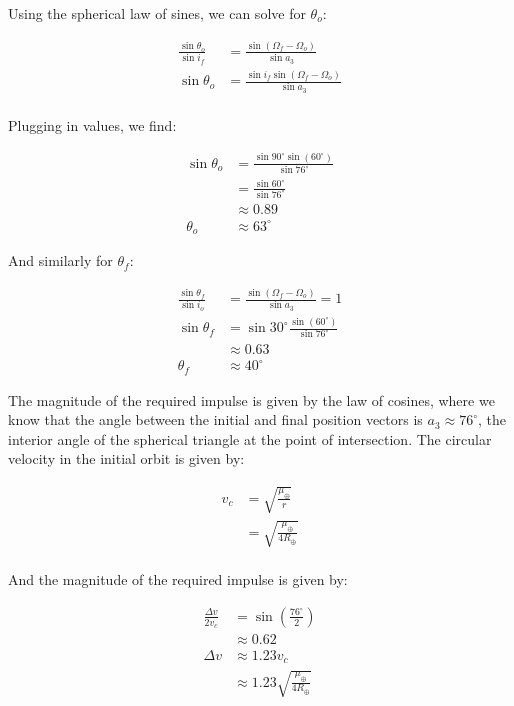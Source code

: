 Using the spherical law of sines, we can solve for $\theta_o$:

\begin{align*}
    \frac{\sin\theta_o}{\sin i_f} &= \frac{\sin(\Omega_f - \Omega_o)}{\sin a_3} \\
    \sin\theta_o &= \frac{\sin i_f \sin(\Omega_f - \Omega_o)}{\sin a_3} \\
\end{align*}

Plugging in values, we find:

\begin{align*}
    \sin\theta_o &= \frac{\sin 90^\circ \sin(60^\circ)}{\sin 76^\circ} \\
    &= \frac{\sin 60^\circ}{\sin 76^\circ} \\
    &\approx 0.89 \\
    \theta_o &\approx 63^\circ
\end{align*}

And similarly for $\theta_f$:

\begin{align*}
    \frac{\sin\theta_f}{\sin i_o} &= \frac{\sin(\Omega_f - \Omega_o)}{\sin a_3} = 1 \\
    \sin\theta_f &= \sin 30^\circ \frac{\sin(60^\circ)}{\sin 76^\circ} \\
    &\approx 0.63 \\
    \theta_f &\approx 40^\circ
\end{align*}

The magnitude of the required impulse is given by the law of cosines, where we know that the angle between the initial and final position vectors is $a_3 \approx 76^\circ$, the interior angle of the spherical triangle at the point of intersection. The circular velocity in the initial orbit is given by:

\begin{align*}
    v_c &= \sqrt{\frac{\mu_\oplus}{r}} \\
    &= \sqrt{\frac{\mu_\oplus}{4R_\oplus}} \\
\end{align*}

And the magnitude of the required impulse is given by:

\begin{align*}
    \frac{\Delta v}{2 v_c} &= \sin\left( \frac{76^\circ}{2} \right) \\
    &\approx 0.62 \\
    \Delta v &\approx 1.23 v_c \\
    &\approx 1.23 \sqrt{\frac{\mu_\oplus}{4R_\oplus}} \\
\end{align*}

